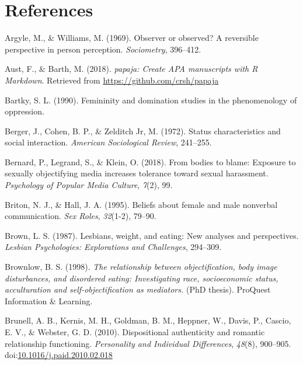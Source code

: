 \documentclass[man]{apa6}
\begin{document}
\section{References}\label{references}

\newpage

\begingroup
\setlength{\parindent}{-0.5in} \setlength{\leftskip}{0.5in}

\hypertarget{refs}{}
\hypertarget{ref-argyle1969}{}
Argyle, M., \& Williams, M. (1969). Observer or observed? A reversible
perspective in person perception. \emph{Sociometry}, 396--412.

\hypertarget{ref-R-papaja}{}
Aust, F., \& Barth, M. (2018). \emph{papaja: Create APA manuscripts with
R Markdown}. Retrieved from \url{https://github.com/crsh/papaja}

\hypertarget{ref-Bartky}{}
Bartky, S. L. (1990). Femininity and domination studies in the
phenomenology of oppression.

\hypertarget{ref-berger1972}{}
Berger, J., Cohen, B. P., \& Zelditch Jr, M. (1972). Status
characteristics and social interaction. \emph{American Sociological
Review}, 241--255.

\hypertarget{ref-bernard2018bodies}{}
Bernard, P., Legrand, S., \& Klein, O. (2018). From bodies to blame:
Exposure to sexually objectifying media increases tolerance toward
sexual harassment. \emph{Psychology of Popular Media Culture},
\emph{7}(2), 99.

\hypertarget{ref-briton1995}{}
Briton, N. J., \& Hall, J. A. (1995). Beliefs about female and male
nonverbal communication. \emph{Sex Roles}, \emph{32}(1-2), 79--90.

\hypertarget{ref-brown1987lesbians}{}
Brown, L. S. (1987). Lesbians, weight, and eating: New analyses and
perspectives. \emph{Lesbian Psychologies: Explorations and Challenges},
294--309.

\hypertarget{ref-brownlow1998relationship}{}
Brownlow, B. S. (1998). \emph{The relationship between objectification,
body image disturbances, and disordered eating: Investigating race,
socioeconomic status, acculturation and self-objectification as
mediators.} (PhD thesis). ProQuest Information \& Learning.

\hypertarget{ref-brunelletal2010}{}
Brunell, A. B., Kernis, M. H., Goldman, B. M., Heppner, W., Davis, P.,
Cascio, E. V., \& Webster, G. D. (2010). Dispositional authenticity and
romantic relationship functioning. \emph{Personality and Individual
Differences}, \emph{48}(8), 900--905.
doi:\href{https://doi.org/10.1016/j.paid.2010.02.018}{10.1016/j.paid.2010.02.018}
\end{document}
